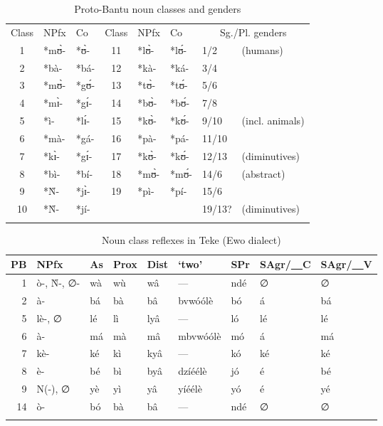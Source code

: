 \documentclass[output=paper,,modfonts,nonflat]{langsci/langscibook}
\begin{document}
\begin{table}[p]
\caption{Proto-Bantu noun classes and genders}
\begin{small}
\label{table1}
\begin{tabular}{cllcll ll}
\lsptoprule
Class	&	NPfx	&	Co	&	Class	&	NPfx	&	Co	&	\multicolumn{2}{c}{Sg./Pl. genders}\\
\cmidrule{1-3}\cmidrule(l){4-6}\cmidrule(l){7-8}
1	&	*mʊ̀-	&	\cellcolor{gray!60}*ʊ̀-	&	11	&	*lʊ̀-	&	*lʊ́-	&	1/2	&	(humans)	\\	
2	&	*bà-	&	*bá-	&	12	&	*kà-	&	*ká-	&	3/4	&		\\	
3	&	*mʊ̀-	&	*gʊ́-	&	13	&	*tʊ̀-	&	*tʊ́-	&	5/6	&		\\	
4	&	*mɪ̀-	&	*gɪ́-	&	14	&	*bʊ̀-	&	*bʊ́-	&	7/8	&		\\	
5	&	*ì-	&	*lɪ́-	&	15	&	*kʊ̀-	&	*kʊ́-	&	9/10	&	(incl. animals)	\\	
6	&	*mà-	&	*gá-	&	16	&	*pà-	&	*pá-	&	11/10	&		\\	
7	&	*kɪ̀-	&	*gɪ́-	&	17	&	*kʊ̀-	&	*kʊ́-	&	12/13	&	(diminutives)	\\	
8	&	*bì-	&	*bí-	&	18	&	*mʊ̀-	&	*mʊ́-	&	14/6	&	(abstract)	\\	
9	&	*Ǹ-	&  	\cellcolor{gray!60}*jɪ̀-	&	19	&	*pì-	&	*pí-	&	15/6	&		\\	
10	&	*Ǹ-	&	*jí-	&		&		& &	19/13?	&	(diminutives)	\\	\lspbottomrule
\end{tabular}
\end{small}
\end{table}

\begin{table}[p]
\caption{Noun class reflexes in Teke (Ewo dialect)}
\label{table2}
\begin{small}
\begin{tabular}{rllllllll}
  \lsptoprule
PB	&	NPfx	&	\cellcolor{gray!60}As	&	Prox	&	Dist	&	`two’	&	SPr	&	SAgr/\underline{~~}C	&	SAgr/\underline{~~}V	\\	
\midrule
1	&	ò-, Ǹ-, ∅-	&	\cellcolor{gray!60}wà	&	wù	&	wâ	&	---	&	ndé	&	∅	&	∅	\\	
2	&	à-	&	\cellcolor{gray!60}bá	&	bà	&	bâ	&	bvwóólè	&	bó	&	á	&	bá	\\	
5	&	lè-, ∅	&	\cellcolor{gray!60}lé	&	lì	&	lyâ	&	---	&	ló	&	lé	&	lé	\\	
6	&	à-	&	\cellcolor{gray!60}má	&	mà	&	mâ	&	mbvwóólè	&	mó	&	á	&	má	\\	
7	&	kè-	&	\cellcolor{gray!60}ké	&	kì	&	kyâ	&	---	&	kó	&	ké	&	ké	\\	
8	&	è-	&	\cellcolor{gray!60}bé	&	bì	&	byâ	&	dzíéélè	&	jó	&	é	&	bé	\\	
9	&	N(-), ∅	&	\cellcolor{gray!60}yè	&	yì	&	yâ	&	yíéélè	&	yó	&	é	&	yé	\\	
14	&	ò-	&	\cellcolor{gray!60}bó	&	bà	&	bâ	&	---	&	ndé	&	∅	&	∅	\\
  \lspbottomrule
\end{tabular}
\end{small}
\end{table}
\end{document}
